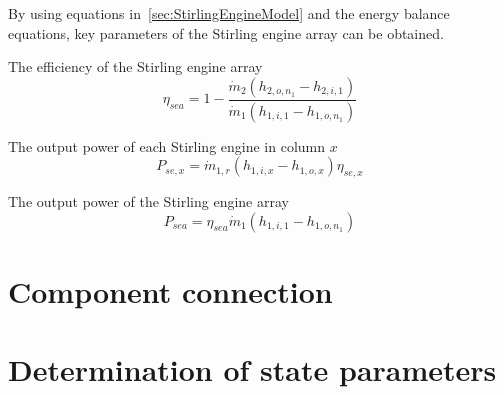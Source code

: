 By using equations in~\ref{sec:StirlingEngineModel} and the energy balance equations, key parameters of the Stirling engine array can be obtained. 

The efficiency of the Stirling engine array \begin{equation}
  \eta_{sea}=1-\dfrac{\dot{m}_{2}(h_{2,o,n_1}-h_{2,i,1})}{\dot{m}_{1}(h_{1,i,1}-h_{1,o,n_1})}
\end{equation}

The output power of each Stirling engine in column $x$
\begin{equation}
  P_{se,x}=\dot{m}_{1,r}(h_{1,i,x}-h_{1,o,x})\eta_{se,x}
\end{equation}

The output power of the Stirling engine array
\begin{equation}
  P_{sea}=\eta_{sea}\dot{m}_{1}(h_{1,i,1}-h_{1,o,n_1})
\end{equation}

\section{Component connection}

\section{Determination of state parameters}

